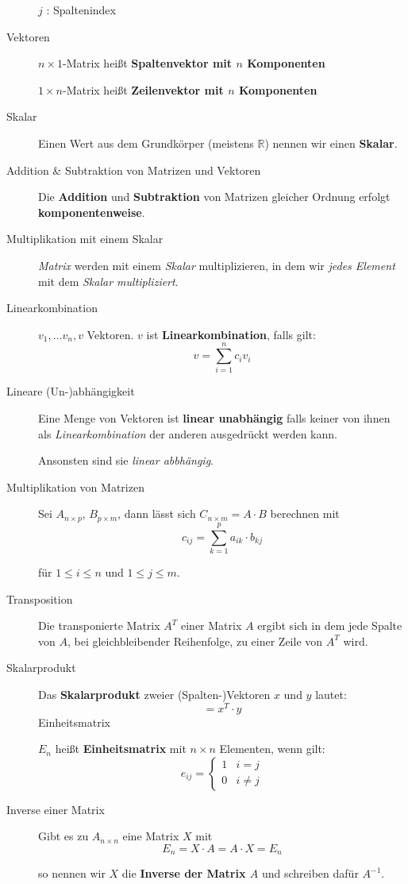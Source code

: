 \documentclass[
  ngerman,
  a4paper,
  landscape, fontsize=9pt, version=first, enabledeprecatedfontcommands,
  DIV=6]{scrartcl}
\begin{document}
\begin{multicols}{3}
\begin{description}
\(j\) : Spaltenindex
\item[Vektoren]
\(n\times 1\)-Matrix heißt \textbf{Spaltenvektor mit \(n\) Komponenten}

\(1\times n\)-Matrix heißt \textbf{Zeilenvektor mit \(n\) Komponenten}
\item[Skalar]
Einen Wert aus dem Grundkörper (meistens \(\mathbb{R}\)) nennen wir
einen \textbf{Skalar}.
\item[Addition \& Subtraktion von Matrizen und Vektoren]
Die \textbf{Addition} und \textbf{Subtraktion} von Matrizen gleicher
Ordnung erfolgt \textbf{komponentenweise}.
\item[Multiplikation mit einem Skalar]
\emph{Matrix} werden mit einem \emph{Skalar} multiplizieren, in dem wir
\emph{jedes Element} mit dem \emph{Skalar multipliziert}.
\item[Linearkombination]
\(v_1, \dots v_n, v\) Vektoren. \(v\) ist \textbf{Linearkombination},
falls gilt: \[v = \sum_{i=1}^{n} c_i v_i\]
\item[Lineare (Un-)abhängigkeit]
Eine Menge von Vektoren ist \textbf{linear unabhängig} falls keiner von
ihnen als \emph{Linearkombination} der anderen ausgedrückt werden kann.

Ansonsten sind sie \emph{linear abbhängig}.
\item[Multiplikation von Matrizen]
Sei \(A_{n \times p}\), \(B_{p \times m}\), dann lässt sich
\(C_{n \times m} =A \cdot B\) berechnen mit
\[c_{ij} = \sum_{k=1}^{p} a_{ik}\cdot b_{kj}\]

für \(1 \leq i \leq n\) und \(1 \leq j \leq m\).
\item[Transposition]
Die transponierte Matrix \(A^T\) einer Matrix \(A\) ergibt sich in dem
jede Spalte von \(A\), bei gleichbleibender Reihenfolge, zu einer Zeile
von \(A^T\) wird.
\item[Skalarprodukt]
Das \textbf{Skalarprodukt} zweier (Spalten-)Vektoren \(x\) und \(y\)
lautet: \[<x, y> = x^T \cdot y\] Einheitsmatrix

\(E_n\) heißt \textbf{Einheitsmatrix} mit \(n \times n\) Elementen, wenn
gilt: \[e_{ij} = \begin{cases}
     1 & i=j \\ 
     0 & i\neq j 
\end{cases}\]
\item[Inverse einer Matrix]
Gibt es zu \(A_{n \times n}\) eine Matrix \(X\) mit
\[E_n = X \cdot A = A \cdot X = E_n\]

so nennen wir \(X\) die \textbf{Inverse der Matrix \(A\)} und schreiben
dafür \(A^{-1}\).
\end{description}


\end{multicols}
\end{document}
